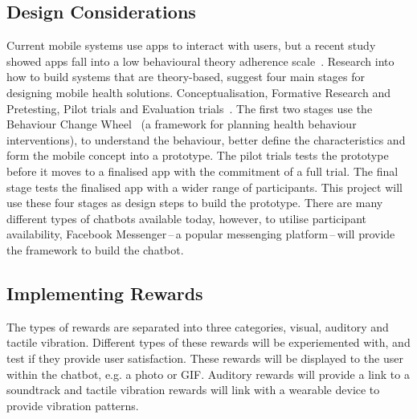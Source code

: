\subsection{Design Considerations}
Current mobile systems use apps to interact with users, but a recent study showed apps fall into a low behavioural theory adherence scale~\cite{article_mhealth}. Research into how to build systems that are theory-based, suggest four main stages for designing mobile health solutions. Conceptualisation, Formative Research and Pretesting, Pilot trials and Evaluation trials~\cite{article_mhealth}. The first two stages use the Behaviour Change Wheel~\cite{article_behaviour_change_wheel} (a framework for planning health behaviour interventions), to understand the behaviour, better define the characteristics and form the mobile concept into a prototype. The pilot trials tests the prototype before it moves to a finalised app with the commitment of a full trial. The final stage tests the finalised app with a wider range of participants. This project will use these four stages as design steps to build the prototype.\newline
\newline
There are many different types of chatbots available today, however, to utilise participant availability, Facebook Messenger\,--\,a popular messenging platform\,--\,will provide the framework to build the chatbot.

\subsection{Implementing Rewards}
The types of rewards are separated into three categories, visual, auditory and tactile vibration. Different types of these rewards will be experiemented with, and test if they provide user satisfaction. These rewards will be displayed to the user within the chatbot, e.g. a photo or GIF. Auditory rewards will provide a link to a soundtrack and tactile vibration rewards will link with a wearable device to provide vibration patterns.

\newpage






